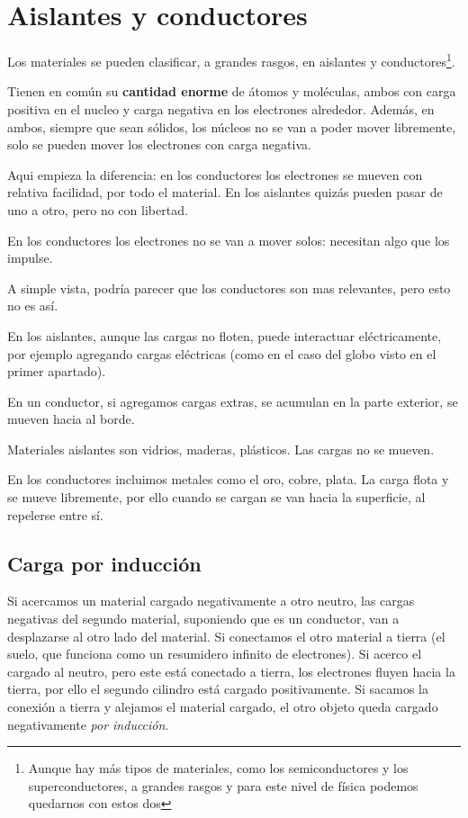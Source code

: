 \section{Aislantes y conductores}

Los materiales se pueden clasificar,
a grandes rasgos,
en aislantes y conductores\footnote{Aunque hay más tipos de materiales, como los semiconductores y los superconductores, a grandes rasgos y para este nivel de física podemos quedarnos con estos dos}.

Tienen en común su \textbf{cantidad enorme} de átomos y moléculas,
ambos con carga positiva en el nucleo y carga negativa en los electrones alrededor.
Además, en ambos,
siempre que sean sólidos,
los núcleos no se van a poder mover libremente,
solo se pueden mover los electrones con carga negativa.

Aqui empieza la diferencia:
en los conductores los electrones se mueven con relativa facilidad,
por todo el material.
En los aislantes quizás pueden pasar de uno a otro,
pero no con libertad.

En los conductores los electrones no se van a mover solos:
necesitan algo que los impulse.

A simple vista,
podría parecer que los conductores son mas relevantes,
pero esto no es así.

En los aislantes,
aunque las cargas no floten,
puede interactuar eléctricamente,
por ejemplo agregando cargas eléctricas
(como en el caso del globo visto en el primer apartado).

En un conductor,
si agregamos cargas extras,
se acumulan en la parte exterior,
se mueven hacia al borde.

Materiales aislantes son vidrios, maderas, plásticos.
Las cargas no se mueven.

En los conductores incluimos metales como el oro, cobre, plata.
La carga flota y se mueve libremente,
por ello cuando se cargan se van hacia la superficie,
al repelerse entre sí.

\subsection{Carga por inducción}

Si acercamos un material cargado negativamente a otro neutro,
las cargas negativas del segundo material,
suponiendo que es un conductor,
van a desplazarse al otro lado del material.
Si conectamos el otro material a tierra
(el suelo, que funciona como un resumidero infinito de electrones).
Si acerco el cargado al neutro,
pero este está conectado a tierra,
los electrones fluyen hacia la tierra,
por ello el segundo cilindro está cargado positivamente.
Si sacamos la conexión a tierra y alejamos el material cargado,
el otro objeto queda cargado negativamente \textit{por inducción}.